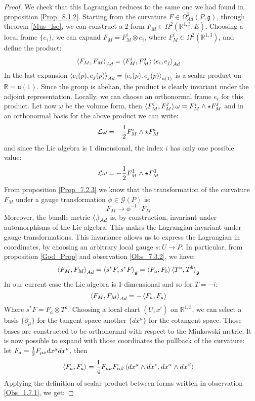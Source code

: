 \documentclass[12pt,a4paper]{report}
\theoremstyle{definition}
\theoremstyle{Theorem}
\theoremstyle{definition}
\theoremstyle{definition}
\begin{document}
	\begin{proof}
		We check that this Lagrangian reduces to the same one we had found in proposition \ref{Prop_8.1.2}. Starting from the curvature $F\in \Omega^2_{Ad}(P,\mathfrak{g})$, through theorem \ref{Mus_Iso}, we can construct a $2$-form $F_M\in \Omega^2(\mathbb{R}^{1,3},E)$. Choosing a local frame $\{e_i\}$, we can expand $F_M=F^i_{M}\otimes e_i$, where $F_M^i\in \Omega^2(\mathbb{R}^{1,3})$, and define the product: $$\braket{F_M,F_M}_{Ad}=\braket{F_M^i,F_M^j}\braket{e_i,e_j}_{Ad}$$
		In the last expansion $\braket{e_i(p),e_j(p)}_{Ad}=\braket{e_i(p),e_j(p)}_{\mathfrak{u}(1)}$ is a scalar product on $\mathbb{R}=\mathfrak{u}(1)$. Since the group is abelian, the product is clearly invariant under the adjoint representation. Locally, we can choose an orthonormal frame $e_i$ for this product. Let now $\omega$ be the volume form, then $\braket{F_M^i,F_M^j}\omega=F_M^i\wedge\star F_M^j$ and in an orthonormal basis for the above product we can write:
		$$\mathcal{L}\omega=-{1\over 2}F_M^i\wedge \star F_M^i$$
		and since the Lie algebra is $1$ dimensional, the index $i$ has only one possible value:
		$$\mathcal{L}\omega=-{1\over 2}F^1_M\wedge \star F^1_M$$
		From proposition \ref{Prop_7.2.3} we know that the transformation of the curvature $F_M$ under a gauge transformation $\phi\in \mathcal{G}(P)$ is:
		$$F_M\rightarrow \phi^{-1}\cdot F_M$$
		Moreover, the bundle metric $\braket{,}_{Ad}$ is, by construction, invariant under automorphisms of the Lie algebra. This makes the Lagrangian invariant under gauge transformations. This invariance allows us to express the Lagrangian in coordinates, by choosing an arbitrary local gauge $s:U\rightarrow P$. In particular, from proposition \ref{God_Prop} and observation \ref{Obs_7.3.2}, we have:
		$$\braket{F_M,F_M}_{Ad}=\braket{s^*F,s^*F}_\mathfrak{g}=\braket{F_a,F_b}\braket{T^a,T^b}_\mathfrak{g}$$
		In our current case the Lie algebra is 1 dimensional and so for $T=-i$:
		$$\braket{F_M,F_M}_{Ad}=-\braket{F_a,F_a}$$
		Where $s^*F=F_a\otimes T^a$.
		Choosing a local chart $(U,x^i)$ on $\mathbb{R}^{1,3}$, we can select a basis $\{\partial_\mu\}$ for the tangent space another $\{dx^\mu\}$ for the cotangent space. Those bases are constructed to be orthonormal with respect to the Minkowski metric. It is now possible to expand with those coordinates the pullback of the curvature: let $F_a={1\over 2}F_{\mu\nu}dx^\mu dx^\nu$, then
		$$\braket{F_a,F_a}={1\over 4}F_{\mu\nu} F_{\alpha\beta}\braket{dx^\mu\wedge dx^\nu,dx^\alpha\wedge dx^\beta}$$ 
		Applying the definition of scalar product between forms written in observation \ref{Obs_1.7.1}, we get:

\end{proof}
\end{document}
